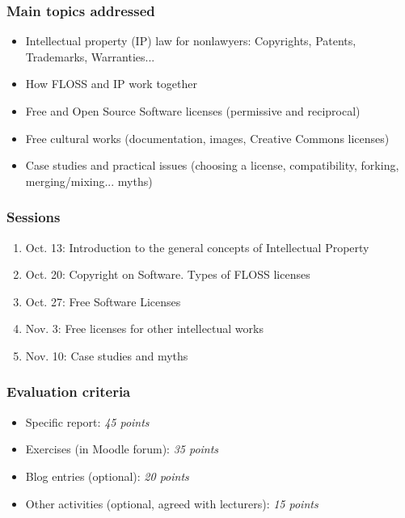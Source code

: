 
\begin{frame}
\frametitle{Main topics addressed}

\begin{itemize}
   \item Intellectual property (IP) law \alert{for nonlawyers}: Copyrights,
Patents, Trademarks, Warranties...
   \item How FLOSS and IP work together
   \item Free and Open Source Software licenses (permissive and reciprocal)
   \item Free cultural works (documentation, images, Creative Commons
licenses)
   \item Case studies and practical issues (choosing a license, compatibility,
forking, merging/mixing... myths)
\end{itemize}

\end{frame}



\begin{frame}
\frametitle{Sessions}

\begin{enumerate}
\item \alert{Oct. 13:} Introduction to the general concepts of Intellectual Property
\item \alert{Oct. 20:} Copyright on Software. Types of FLOSS licenses
\item \alert{Oct. 27:} Free Software Licenses
\item \alert{Nov. 3:} Free licenses for other intellectual works
\item \alert{Nov. 10:} Case studies and myths
\end{enumerate}

\end{frame}



\begin{frame}
\frametitle{Evaluation criteria}

\begin{itemize}
\item \alert{Specific report}: \textit{45 points}
\item \alert{Exercises} (in Moodle forum): \textit{35 points}
\item \alert{Blog entries} (optional): \textit{20 points} 
\item \alert{Other activities} (optional, agreed with lecturers): \textit{15 points} 
\end{itemize}

\end{frame}

